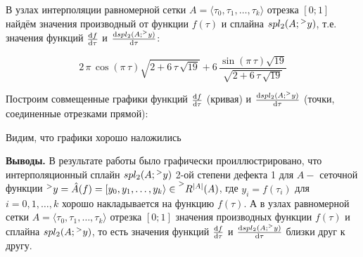 \documentclass[14pt,a4paper]{scrartcl}
\begin{document}
\clearpage
В узлах интерполяции равномерной сетки $A = \langle \tau_0, \tau_1, \ldots, \tau_k\rangle$ отрезка $[0;1]$ найдём значения производный от функции $f(\tau)$ и сплайна $spl_2(A;\prescript{>}{}{y})$, т.е. значения функций $\dv{f}{\tau}$ и $\dv{spl_2(A;\prescript{>}{}{y})}{\tau}$:

\begin{equation*}
	2\,\pi\,\cos \left( \pi\,\tau \right) \sqrt {2+6\,\tau\,\sqrt {19}}+6
	\,{\frac {\sin \left( \pi\,\tau \right) \sqrt {19}}{\sqrt {2+6\,\tau\,
				\sqrt {19}}}}
\end{equation*}


Построим совмещенные графики функций $\dv{f}{\tau}$ (кривая) и $\dv{spl_2(A;\prescript{>}{}{y})}{\tau}$ (точки, соединенные отрезками прямой):

\begin{figure}[h]
\end{figure}

Видим, что графики хорошо наложились

\textbf{Выводы.}
В результате работы было графически проиллюстрировано, что интерполяционный сплайн $spl_2(A;\prescript{>}{}{y})$ 2-ой степени дефекта 1 для $A-$ сеточной функции $\prescript{>}{}{y} = \hat{A}(f) = [y_0,y_1,\ldots,y_k\rangle \in \prescript{>}{}{R^{|A|}(A)}$, где $y_i=f(\tau_i)$ для $i=0,1,\ldots,k$ хорошо накладывается на функцию $f(\tau)$. А в узлах равномерной сетки $A = \langle \tau_0, \tau_1, \ldots, \tau_k\rangle$ отрезка $[0;1]$ значения производных функции $f(\tau)$ и сплайна $spl_2(A;\prescript{>}{}{y})$, то есть значения функций $\dv{f}{\tau}$ и $\dv{spl_2(A;\prescript{>}{}{y})}{\tau}$ близки друг к другу.
\end{document}

